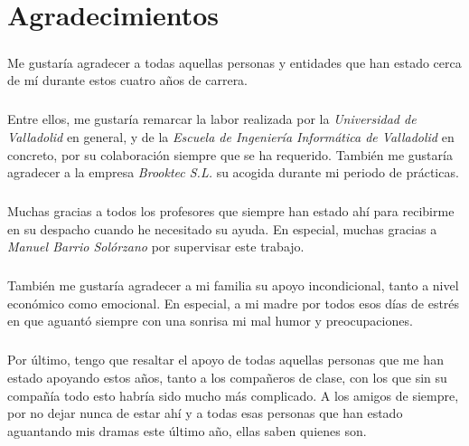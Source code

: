 \documentclass{subfiles}
\begin{document}
  \chapter*{Agradecimientos}
  \label{sec:acknowledgements}

    \paragraph{}
    Me gustaría agradecer a todas aquellas personas y entidades que han estado cerca de mí durante estos cuatro años de carrera.

    \paragraph{}
    Entre ellos, me gustaría remarcar la labor realizada por la \emph{Universidad de Valladolid} en general, y de la \emph{Escuela de Ingeniería Informática de Valladolid} en concreto, por su colaboración siempre que se ha requerido. También me gustaría agradecer a la empresa \emph{Brooktec S.L.} su acogida durante mi periodo de prácticas.

    \paragraph{}
    Muchas gracias a todos los profesores que siempre han estado ahí para recibirme en su despacho cuando he necesitado su ayuda. En especial, muchas gracias a \emph{Manuel Barrio Solórzano} por supervisar este trabajo.

    \paragraph{}
    También me gustaría agradecer a mi familia su apoyo incondicional, tanto a nivel económico como emocional. En especial, a mi madre por todos esos días de estrés en que aguantó siempre con una sonrisa mi mal humor y preocupaciones.

    \paragraph{}
    Por último, tengo que resaltar el apoyo de todas aquellas personas que me han estado apoyando estos años, tanto a los compañeros de clase, con los que sin su compañía todo esto habría sido mucho más complicado. A los amigos de siempre, por no dejar nunca de estar ahí y a todas esas personas que han estado aguantando mis dramas este último año, ellas saben quienes son.
\end{document}
